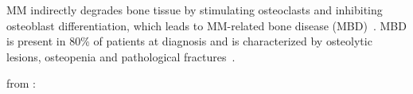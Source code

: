 \ac{MM} indirectly degrades bone tissue by stimulating osteoclasts and inhibiting
osteoblast differentiation, which leads to \ac{MM}-related bone disease
(MBD)~\cite{glaveyProteomicCharacterizationHuman2017}. MBD is present in 80\% of
patients at diagnosis and is characterized by osteolytic lesions, osteopenia and
pathological fractures~\cite{terposPathogenesisBoneDisease2018}.


from \cite{forsterMolecularImpactTumor2022}:






